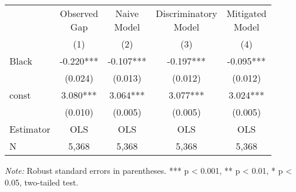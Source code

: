 \begin{tabular}{lcccc}
\toprule
&  \makecell{Observed \\ Gap} & \makecell{Naive \\ Model} &    \makecell{Discriminatory \\ Model} &   \makecell{Mitigated \\ Model}  \\
\cline{2-5}
{} &        (1) &        (2) &        (3) &        (4) \\
\midrule
Black              &  -0.220*** &  -0.107*** &  -0.197*** &  -0.095*** \\
                   &    (0.024) &    (0.013) &    (0.012) &    (0.012) \\
const              &   3.080*** &   3.064*** &   3.077*** &   3.024*** \\
                   &    (0.010) &    (0.005) &    (0.005) &    (0.005) \\
\midrule
Estimator          &        OLS &        OLS &        OLS &        OLS \\
\midrule
N                  &      5,368 &      5,368 &      5,368 &      5,368 \\
\bottomrule
\end{tabular}

\begin{singlespace} \noindent  \textit{Note:} Robust standard errors in parentheses. *** p < 0.001, ** p < 0.01, * p < 0.05, two-tailed test.\end{singlespace}